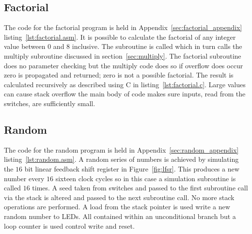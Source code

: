




\subsection{Factorial}
\label{sec:factorial}
The code for the factorial program is held in Appendix~\ref{sec:factorial_appendix} listing~\ref{lst:factorial.asm}.
It is possible to calculate the factorial of any integer value between $0$ and $8$ inclusive.
The subroutine is called which in turn calls the multiply subroutine discussed in section~\ref{sec:multiply}. 
The factorial subroutine does no parameter checking but the multiply code does so if overflow does occur zero is propagated and returned; zero is not a possible factorial.
The result is calculated recursively as described using C in listing~\ref{lst:factorial.c}.
Large values can cause stack overflow the main body of code makes sure inputs, read from the switches, are sufficiently small.

\begin{minipage}{\linewidth}

\end{minipage}





\subsection{Random}
The code for the random program is held in Appendix~\ref{sec:random_appendix} listing~\ref{lst:random.asm}.
A random series of numbers is achieved by simulating the $16$ bit linear feedback shift register in Figure~\ref{fig:lfsr}. 
This produces a new number every $16$ sixteen clock cycles so in this case a simulation subroutine is called $16$ times.
A seed taken from switches and passed to the first subroutine call via the stack is altered and passed to the next subroutine call.
No more stack operations are performed.
A load from the stack pointer is used write a new random number to LEDs.
All contained within an unconditional branch but a loop counter is used control write and reset.

